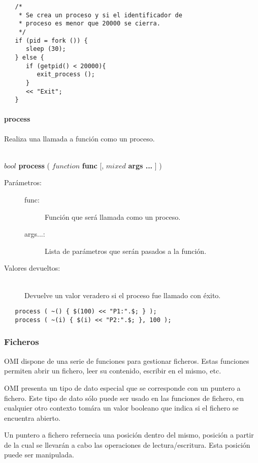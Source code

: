 \begin{lstlisting}  
   /*
    * Se crea un proceso y si el identificador de
    * proceso es menor que 20000 se cierra.
    */
   if (pid = fork ()) {
      sleep (30);
   } else {
      if (getpid() < 20000){
         exit_process ();
      }
      << "Exit";
   }
\end{lstlisting}

\paragraph{process}
Realiza una llamada a función como un proceso.

\begin{framed}
\hfill \\ $bool$ \textbf{process} ( $function$ \textbf{func} [, $mixed$ \textbf{args ...} ]  )  
\begin{description}
\item [Parámetros:] \hfill 
   \begin{description}
   \item[func:] Función que será llamada como un proceso.
   \item[args...:] Lista de parámetros que serán pasados a la función.
   \end{description}
\item[Valores devueltos:] \hfill \\
   Devuelve un valor veradero si el proceso fue llamado con éxito.
\end{description}
\end{framed}

\begin{lstlisting}  
   process ( ~() { $(100) << "P1:".$; } );
   process ( ~(i) { $(i) << "P2:".$; }, 100 );  
\end{lstlisting}

\subsubsection{Ficheros}
OMI dispone de una serie de funciones para gestionar ficheros. Estas funciones permiten
abrir un fichero, leer su contenido, escribir en el mismo, etc.

OMI presenta un tipo de dato especial que se corresponde con un puntero a fichero. Este tipo 
de  dato sólo puede ser usado en las funciones de fichero, en cualquier otro contexto 
tomára un valor booleano que indica si el fichero se encuentra abierto. 

Un puntero a fichero refernecia una posición dentro del mismo, posición a partir de la cual 
se llevarán a cabo las operaciones de lectura/escritura. Esta posición puede ser manipulada.

